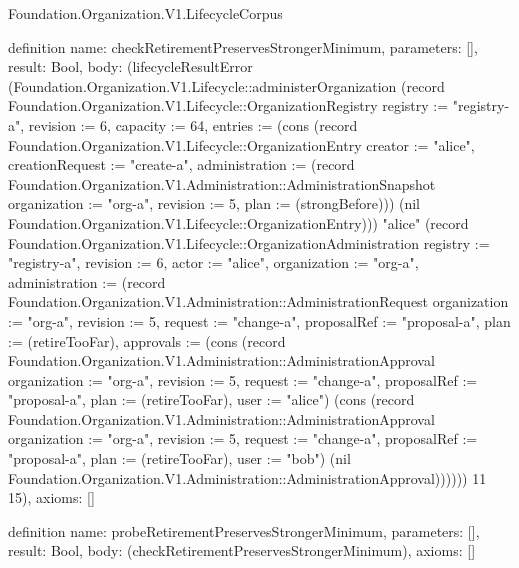 \begin{lexlean}{Foundation.Organization.V1.LifecycleCorpus}
\begin{semanticmodule}
definition{
  name: checkRetirementPreservesStrongerMinimum,
  parameters: [],
  result: Bool,
  body: (lifecycleResultError (Foundation.Organization.V1.Lifecycle::administerOrganization (record Foundation.Organization.V1.Lifecycle::OrganizationRegistry {registry := "registry-a", revision := 6, capacity := 64, entries := (cons (record Foundation.Organization.V1.Lifecycle::OrganizationEntry {creator := "alice", creationRequest := "create-a", administration := (record Foundation.Organization.V1.Administration::AdministrationSnapshot {organization := "org-a", revision := 5, plan := (strongBefore)})}) (nil Foundation.Organization.V1.Lifecycle::OrganizationEntry))}) "alice" (record Foundation.Organization.V1.Lifecycle::OrganizationAdministration {registry := "registry-a", revision := 6, actor := "alice", organization := "org-a", administration := (record Foundation.Organization.V1.Administration::AdministrationRequest {organization := "org-a", revision := 5, request := "change-a", proposalRef := "proposal-a", plan := (retireTooFar), approvals := (cons (record Foundation.Organization.V1.Administration::AdministrationApproval {organization := "org-a", revision := 5, request := "change-a", proposalRef := "proposal-a", plan := (retireTooFar), user := "alice"}) (cons (record Foundation.Organization.V1.Administration::AdministrationApproval {organization := "org-a", revision := 5, request := "change-a", proposalRef := "proposal-a", plan := (retireTooFar), user := "bob"}) (nil Foundation.Organization.V1.Administration::AdministrationApproval)))})})) 11 15),
  axioms: []
}

definition{
  name: probeRetirementPreservesStrongerMinimum,
  parameters: [],
  result: Bool,
  body: (checkRetirementPreservesStrongerMinimum),
  axioms: []
}


\end{semanticmodule}
\end{lexlean}
